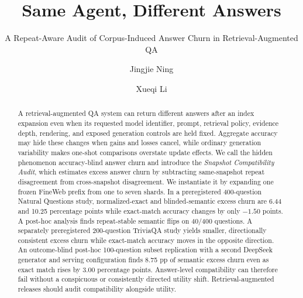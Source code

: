 \documentclass[sigconf,nonacm]{acmart}
\begin{document}
\title{Same Agent, Different Answers}
\subtitle{A Repeat-Aware Audit of Corpus-Induced Answer Churn in Retrieval-Augmented QA}

\author{Jingjie Ning}

\author{Xueqi Li}

\renewcommand{\shortauthors}{Ning and Li}

\begin{abstract}
A retrieval-augmented QA system can return different answers after an index expansion even when its requested model identifier, prompt, retrieval policy, evidence depth, rendering, and exposed generation controls are held fixed. Aggregate accuracy may hide these changes when gains and losses cancel, while ordinary generation variability makes one-shot comparisons overstate update effects. We call the hidden phenomenon accuracy-blind answer churn and introduce the \emph{Snapshot Compatibility Audit}, which estimates excess answer churn by subtracting same-snapshot repeat disagreement from cross-snapshot disagreement. We instantiate it by expanding one frozen FineWeb prefix from one to seven shards. In a preregistered 400-question Natural Questions study, normalized-exact and blinded-semantic excess churn are 6.44 and 10.25 percentage points while exact-match accuracy changes by only $-1.50$ points. A post-hoc analysis finds repeat-stable semantic flips on 40/400 questions. A separately preregistered 200-question TriviaQA study yields smaller, directionally consistent excess churn while exact-match accuracy moves in the opposite direction. An outcome-blind post-hoc 100-question subset replication with a second DeepSeek generator and serving configuration finds 8.75 pp of semantic excess churn even as exact match rises by 3.00 percentage points. Answer-level compatibility can therefore fail without a conspicuous or consistently directed utility shift. Retrieval-augmented releases should audit compatibility alongside utility.
\end{abstract}

\end{document}

